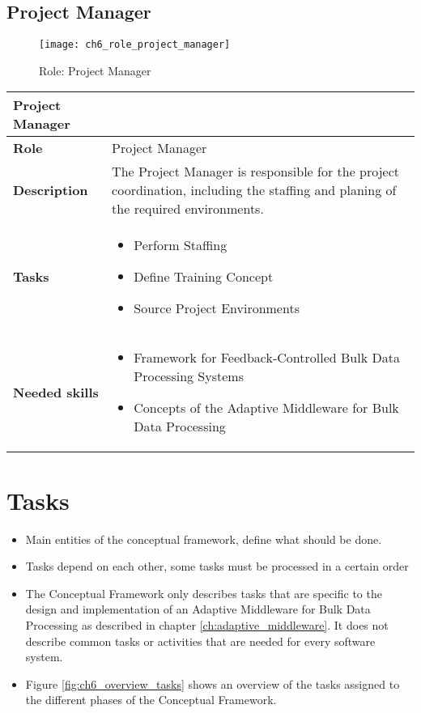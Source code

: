 \subsection{Project Manager}

\begin{figure}[htpb] \centering 
	\texttt{[image: ch6\_role\_project\_manager]} 
	\caption{Role: Project Manager} 
	\label{fig:ch6_role_project_manager} 
\end{figure}

\begin{tabularx}{\textwidth}{@{} l X @{}}
	\caption{table}{Project Manager} \label{table:ch6_Role_Project_Manager}\\
	\toprule
	\bfseries Role & Project Manager\\
	\midrule
	\bfseries Description & The Project Manager is responsible for the project coordination, including the staffing and planing of the required environments.\\
	\midrule
	\bfseries Tasks & 
	\begin{itemize}
		\item Perform Staffing
		\item Define Training Concept
		\item Source Project Environments
	\end{itemize}
	\\
	\midrule 
	\bfseries Needed skills &
	\begin{itemize}
		\item Framework for Feedback-Controlled Bulk Data Processing Systems
		\item Concepts of the Adaptive Middleware for Bulk Data Processing
	\end{itemize}
	\\
	\bottomrule
\end{tabularx}


\section{Tasks}
\label{sec:ch6_tasks}

\begin{itemize}
	\item Main entities of the conceptual framework, define what should be done.
	\item Tasks depend on each other, some tasks must be processed in a certain order
	\item The Conceptual Framework only describes tasks that are specific to the design and implementation of an Adaptive Middleware for Bulk Data Processing as described in chapter \ref{ch:adaptive_middleware}. It does not describe common tasks or activities that are needed for every software system.
	\item Figure \ref{fig:ch6_overview_tasks} shows an overview of the tasks assigned to the different phases of the Conceptual Framework.
\end{itemize}

